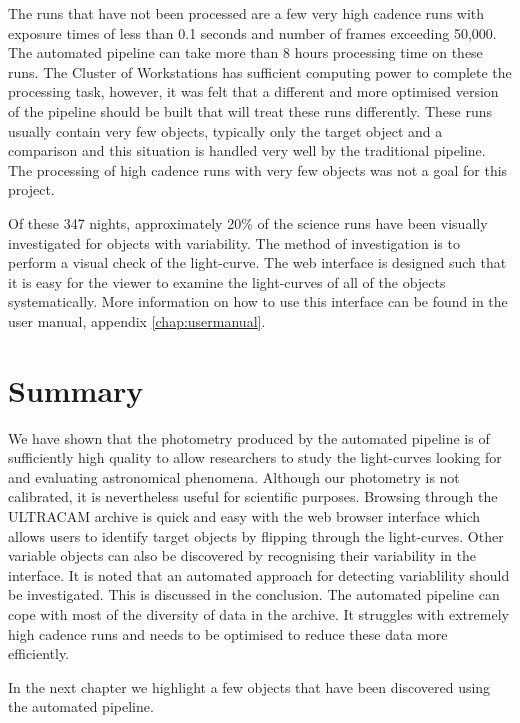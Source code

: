 The runs that have not been processed are a few very high cadence runs with exposure times of less than 0.1 seconds and number of frames exceeding 50,000. The automated pipeline can take more than 8 hours processing time on these runs. The Cluster of Workstations has sufficient computing power to complete the processing task, however, it was felt that a different  and more optimised version of the pipeline should be built that will treat these runs differently. These runs usually contain very few objects, typically only the target object and a comparison and this situation is handled very well by the traditional pipeline. The processing of high cadence runs with very few objects was not a goal for this project. 

Of these 347 nights, approximately 20\% of the science runs have been visually investigated for objects with variability. The method of investigation is to perform a visual check of the light-curve. The web interface is designed such that it is easy for the viewer to examine the light-curves of all of the objects systematically. More information on how to use this interface can be found in the user manual, appendix \ref{chap:usermanual}. 

\section{Summary}
We have shown that the photometry produced by the automated pipeline is of sufficiently high quality to allow researchers to study the light-curves looking for and evaluating astronomical phenomena. Although our photometry is not calibrated, it is nevertheless useful for scientific purposes. Browsing through the ULTRACAM archive is quick and easy with the web browser interface which allows users to identify target objects by flipping through the light-curves. Other variable objects can also be discovered by recognising their variability in the interface. It is noted that an automated approach for detecting variablility should be investigated. This is discussed in the conclusion. The automated pipeline can cope with most of the diversity of data in the archive. It struggles with extremely high cadence runs and needs to be optimised to reduce these data more efficiently.

In the next chapter we highlight a few objects that have been discovered using the automated pipeline. 
